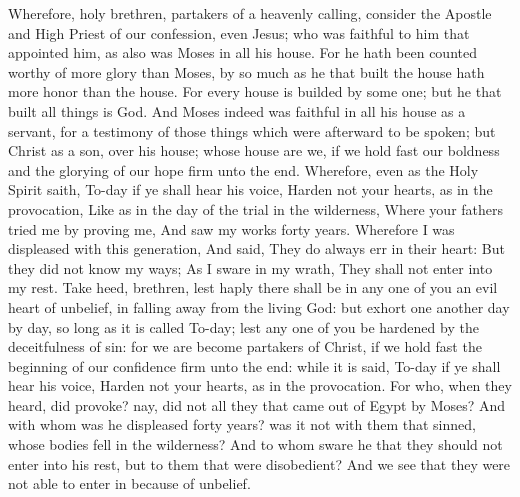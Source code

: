 Wherefore, holy brethren, partakers of a heavenly calling, consider the Apostle and High Priest of our confession, even Jesus; who was faithful to him that appointed him, as also was Moses in all his house. For he hath been counted worthy of more glory than Moses, by so much as he that built the house hath more honor than the house. For every house is builded by some one; but he that built all things is God. And Moses indeed was faithful in all his house as a servant, for a testimony of those things which were afterward to be spoken; but Christ as a son, over his house; whose house are we, if we hold fast our boldness and the glorying of our hope firm unto the end. Wherefore, even as the Holy Spirit saith, To-day if ye shall hear his voice,  Harden not your hearts, as in the provocation, Like as in the day of the trial in the wilderness,  Where your fathers tried me by proving me, And saw my works forty years.  Wherefore I was displeased with this generation, And said, They do always err in their heart: But they did not know my ways;  As I sware in my wrath, They shall not enter into my rest.  Take heed, brethren, lest haply there shall be in any one of you an evil heart of unbelief, in falling away from the living God: but exhort one another day by day, so long as it is called To-day; lest any one of you be hardened by the deceitfulness of sin: for we are become partakers of Christ, if we hold fast the beginning of our confidence firm unto the end: while it is said, To-day if ye shall hear his voice, Harden not your hearts, as in the provocation.  For who, when they heard, did provoke? nay, did not all they that came out of Egypt by Moses? And with whom was he displeased forty years? was it not with them that sinned, whose bodies fell in the wilderness? And to whom sware he that they should not enter into his rest, but to them that were disobedient? And we see that they were not able to enter in because of unbelief. 

